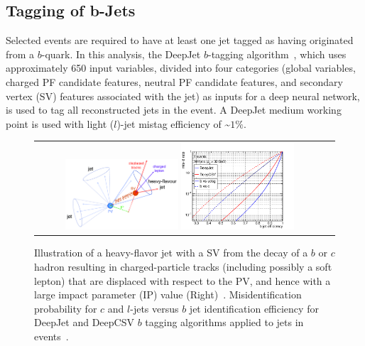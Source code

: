 \subsection{Tagging of b-Jets}
Selected events are required to have at least one jet tagged as having originated from a $b$-quark.
In this analysis, the DeepJet $b$-tagging algorithm~\cite{bib:Bols_2020}, which uses approximately 650 input variables, divided into four categories (global variables, charged PF candidate features, neutral PF candidate features, and secondary vertex (SV) features associated with the jet) as inputs for a deep neural network, is used to tag all reconstructed jets in the event.
A DeepJet medium working point is used with light ($l$)-jet mistag efficiency of \sim$1\%$.
\begin{figure}[htb]
  \begin{center}
    \begin{tabular}{cc}
        \includegraphics[width=0.40\textwidth]{fig_Event_Selection/Secondary_Vertex.png}
        \includegraphics[width=0.40\textwidth]{fig_Event_Selection/DeepJet.png}
    \end{tabular}
    \caption{Illustration of a heavy-flavor jet with a SV from the decay of a $b$ or $c$ hadron resulting in charged-particle tracks (including possibly a soft lepton) that are displaced with respect to the PV, and hence with a large impact parameter (IP) value (Right)~\cite{app122010574}.
    Misidentification probability for $c$ and $l$-jets versus $b$ jet identification efficiency for DeepJet and DeepCSV $b$ tagging algorithms applied to jets in \ttbar events~\cite{app122010574}.
            }
    \label{bTagging}
  \end{center}
\end{figure}

